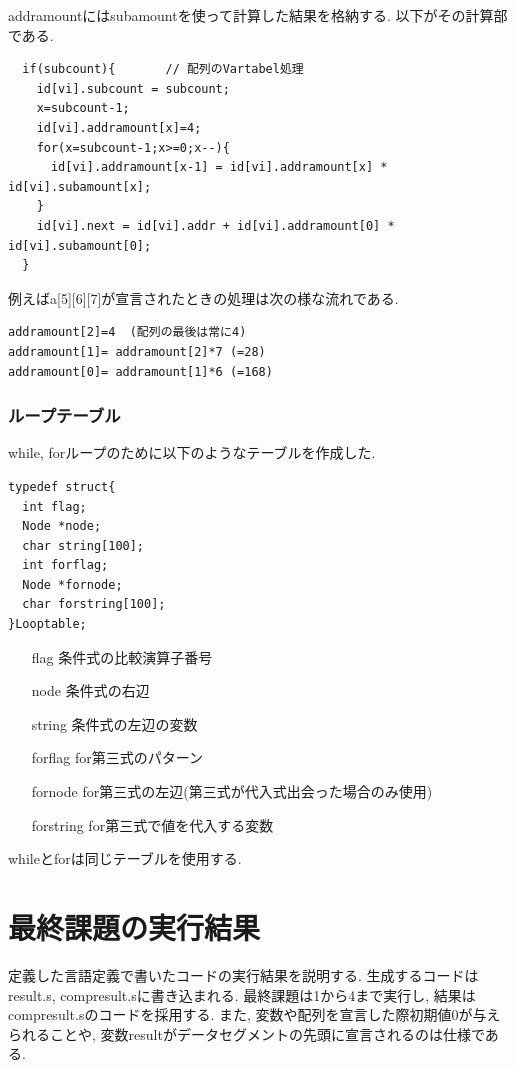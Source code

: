 \documentclass[a4j]{jarticle}
\begin{document}
addramountにはsubamountを使って計算した結果を格納する. 以下がその計算部である. 
\\
\begin{verbatim}
  if(subcount){       // 配列のVartabel処理
    id[vi].subcount = subcount;
    x=subcount-1;
    id[vi].addramount[x]=4;
    for(x=subcount-1;x>=0;x--){
      id[vi].addramount[x-1] = id[vi].addramount[x] * id[vi].subamount[x];
    }
    id[vi].next = id[vi].addr + id[vi].addramount[0] * id[vi].subamount[0];
  }
\end{verbatim}

例えばa[5][6][7]が宣言されたときの処理は次の様な流れである.
\begin{verbatim}
addramount[2]=4  (配列の最後は常に4)
addramount[1]= addramount[2]*7 (=28)
addramount[0]= addramount[1]*6 (=168)
\end{verbatim}

\subsubsection{ループテーブル}
while, forループのために以下のようなテーブルを作成した. 
\begin{verbatim}
typedef struct{
  int flag;       
  Node *node;
  char string[100];
  int forflag;
  Node *fornode;
  char forstring[100];
}Looptable;
\end{verbatim}

\begin{itemize}
\item [flag] 条件式の比較演算子番号
\item [node] 条件式の右辺
\item [string] 条件式の左辺の変数
\item [forflag] for第三式のパターン
\item [fornode] for第三式の左辺(第三式が代入式出会った場合のみ使用)
\item [forstring] for第三式で値を代入する変数
\end{itemize}

whileとforは同じテーブルを使用する. 


\section{最終課題の実行結果}

定義した言語定義で書いたコードの実行結果を説明する. 
生成するコードはresult.s, compresult.sに書き込まれる.
最終課題は1から4まで実行し, 結果はcompresult.sのコードを採用する.
また, 変数や配列を宣言した際初期値0が与えられることや, 変数resultがデータセグメントの先頭に宣言されるのは仕様である. 
\end{document}

